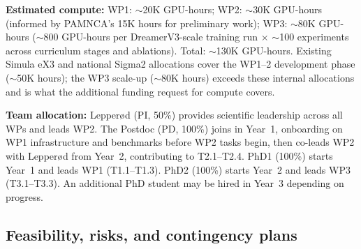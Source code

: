 \noindent\textbf{Estimated compute:} WP1: $\sim$20K GPU-hours; WP2: $\sim$30K GPU-hours (informed by PAMNCA's 15K hours for preliminary work); WP3: $\sim$80K GPU-hours ($\sim$800 GPU-hours per DreamerV3-scale training run $\times$ $\sim$100 experiments across curriculum stages and ablations). Total: $\sim$130K GPU-hours. Existing Simula eX3 and national Sigma2 allocations cover the WP1--2 development phase ($\sim$50K hours); the WP3 scale-up ($\sim$80K hours) exceeds these internal allocations and is what the additional funding request for compute covers.

\noindent\textbf{Team allocation:} Lepperød (PI, 50\%) provides scientific leadership across all WPs and leads WP2. The Postdoc (PD, 100\%) joins in Year~1, onboarding on WP1 infrastructure and benchmarks before WP2 tasks begin, then co-leads WP2 with Lepperød from Year~2, contributing to T2.1--T2.4. PhD1 (100\%) starts Year~1 and leads WP1 (T1.1--T1.3). PhD2 (100\%) starts Year~2 and leads WP3 (T3.1--T3.3). An additional PhD student may be hired in Year~3 depending on progress.

\subsection{Feasibility, risks, and contingency plans}

